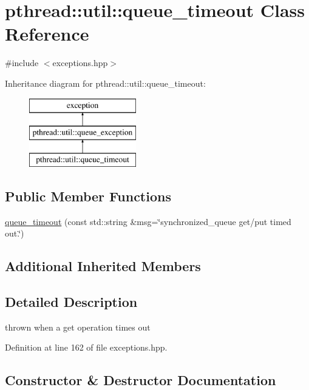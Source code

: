 \hypertarget{classpthread_1_1util_1_1queue__timeout}{}\section{pthread\+:\+:util\+:\+:queue\+\_\+timeout Class Reference}
\label{classpthread_1_1util_1_1queue__timeout}


{\ttfamily \#include $<$exceptions.\+hpp$>$}

Inheritance diagram for pthread\+:\+:util\+:\+:queue\+\_\+timeout\+:\begin{figure}[H]
\begin{center}
\leavevmode
\includegraphics[height=3.000000cm]{classpthread_1_1util_1_1queue__timeout}
\end{center}
\end{figure}
\subsection*{Public Member Functions}
\begin{DoxyCompactItemize}
\item 
\hyperlink{classpthread_1_1util_1_1queue__timeout_a9bbc5bcc7fba68aceb1aec4d4b922b74}{queue\+\_\+timeout} (const std\+::string \&msg=\char`\"{}synchronized\+\_\+queue get/put timed out.\char`\"{})
\end{DoxyCompactItemize}
\subsection*{Additional Inherited Members}


\subsection{Detailed Description}
thrown when a get operation times out 

Definition at line 162 of file exceptions.\+hpp.



\subsection{Constructor \& Destructor Documentation}
